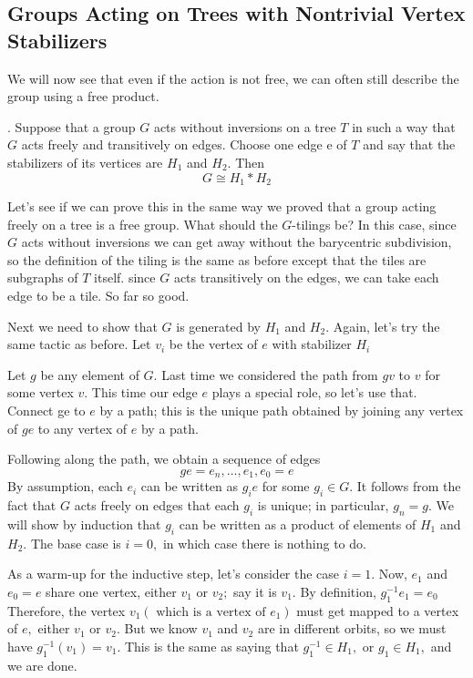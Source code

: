 \subsection{Groups Acting on Trees with Nontrivial Vertex Stabilizers}
We will now see that even if the action is not free, we can often still describe the group using a free product.
\begin{theorem}.
\label{3.2}
Suppose that a group $G$ acts without inversions on a tree $T$ in such a way that $G$ acts freely and transitively on edges. Choose one edge e of $T$ and say that the stabilizers of its vertices are $H_{1}$ and $H_{2} .$ Then
\[
G \cong H_{1} * H_{2}
\]
\end{theorem}
Let's see if we can prove this in the same way we proved that a group acting freely on a tree is a free group. What should the $G$-tilings be? In this case, since $G$ acts without inversions we can get away without the barycentric subdivision, so the definition of the tiling is the same as before except that the tiles are subgraphs of $T$ itself. since $G$ acts transitively on the edges, we can take each edge to be a tile. So far so good.
\par
Next we need to show that $G$ is generated by $H_{1}$ and $H_{2} .$ Again, let's try the same tactic as before. Let $v_{i}$ be the vertex of $e$ with stabilizer $H_{i}$
\par
Let $g$ be any element of $G .$ Last time we considered the path from $g v$ to $v$ for some vertex $v .$ This time our edge $e$ plays a special role, so let's use that. Connect ge to $e$ by a path; this is the unique path obtained by joining any vertex of $g e$ to any vertex of $e$ by a path. 
\par
Following along the path, we obtain a sequence of edges
\[
g e=e_{n}, \ldots, e_{1}, e_{0}=e
\]
By assumption, each $e_{i}$ can be written as $g_{i} e$ for some $g_{i} \in G .$ It follows from the fact that $G$ acts freely on edges that each $g_{i}$ is unique; in particular, $g_{n}=g .$ We will show by induction that $g_{i}$ can be written as a product of elements of $H_{1}$ and
$H_{2} .$ The base case is $i=0,$ in which case there is nothing to do. 
\par
As a warm-up for the inductive step, let's consider the case $i=1 .$ Now, $e_{1}$ and $e_{0}=e$ share one vertex, either $v_{1}$ or $v_{2} ;$ say it is $v_{1} .$ By definition, $g_{1}^{-1} e_{1}=e_{0}$ Therefore, the vertex $v_{1}\left(\text { which is a vertex of } e_{1}\right)$ must get mapped to a vertex of
$e,$ either $v_{1}$ or $v_{2} .$ But we know $v_{1}$ and $v_{2}$ are in different orbits, so we must have $g_{1}^{-1}\left(v_{1}\right)=v_{1} .$ This is the same as saying that $g_{1}^{-1} \in H_{1},$ or $g_{1} \in H_{1},$ and we are done.
